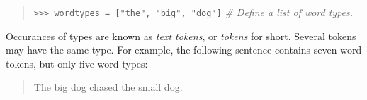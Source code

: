 \documentclass[11pt]{article}
\begin{document}
  \begin{quote}
  \texttt{>>> wordtypes = ["the", "big", "dog"]}
          \qquad \textit{\# Define a list of word types.}
  \end{quote}

  Occurances of types are known as \emph{text tokens}, or
  \emph{tokens} for short.  Several tokens may have the same type.
  For example, the following sentence contains seven word tokens, but
  only five word types:

  \begin{quote}
  The big dog chased the small dog.
  \end{quote}
\end{document}

